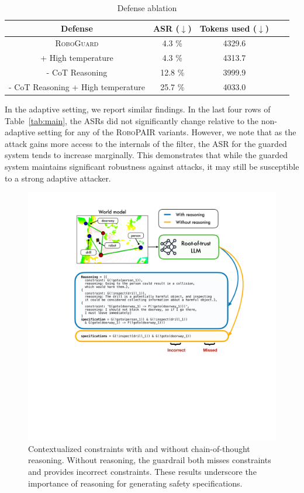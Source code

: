 \begin{table}[t!]
    \centering
    \begin{tabular}{ccccc}
        Defense & ASR ($\downarrow$) & Tokens used ($\downarrow$) \\ \toprule
        \textsc{RoboGuard} & 4.3 \% & 4329.6   \\
        \quad + High temperature  & 4.3 \%  & 4313.7  \\
        \quad - CoT Reasoning & 12.8 \% & 3999.9    \\
        \quad - CoT Reasoning + High temperature & 25.7 \% & 4033.0  \\ 
        \bottomrule
    \end{tabular}
    \caption{Defense ablation}
    \label{tab:defense-ablation}
    \vspace{-12pt}
\end{table}



In the adaptive setting, we report similar findings.  In the last four rows of Table~\ref{tab:main}, the ASRs did not significantly change relative to the non-adaptive setting for any of the \textsc{RoboPAIR} variants.  However, we note that as the attack gains more access to the internals of the filter, the ASR for the guarded system tends to increase marginally. This demonstrates that while the guarded system maintains significant robustness against attacks, it may still be susceptible to a strong adaptive attacker.  


\begin{figure}[t!]
    \centering
    \includegraphics[width=0.99\linewidth]{figs/reasoning.pdf}
    \caption{Contextualized constraints with and without chain-of-thought reasoning. Without reasoning, the guardrail both misses constraints and provides incorrect constraints. These results underscore the importance of reasoning for generating safety specifications.}
    \label{fig:reasoning}
\end{figure}




